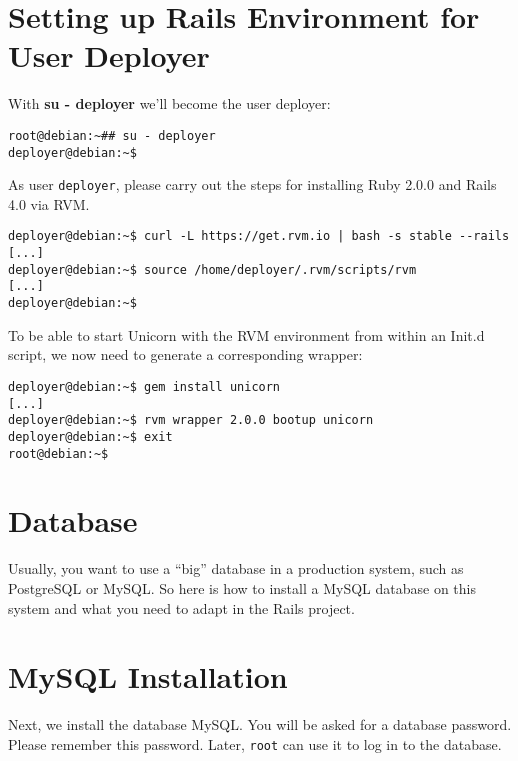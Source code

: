\documentclass[a4paper]{book}
\newcounter{tab}[chapter]
\begin{document}
\section{Setting up Rails Environment for User Deployer}\label{setting-up-rails-environment-for-user-deployer}

With \textbf{su - deployer} we'll become the user deployer:

\begin{shaded}\begin{verbatim}
root@debian:~## su - deployer
deployer@debian:~$
\end{verbatim}\end{shaded}

As user \texttt{deployer}, please carry out the steps for installing Ruby 2.0.0 and Rails 4.0 via RVM.

\begin{shaded}\begin{verbatim}
deployer@debian:~$ curl -L https://get.rvm.io | bash -s stable --rails
[...]
deployer@debian:~$ source /home/deployer/.rvm/scripts/rvm
[...]
deployer@debian:~$
\end{verbatim}\end{shaded}

To be able to start Unicorn with the RVM environment from within an Init.d script, we now need to generate a corresponding wrapper:

\begin{shaded}\begin{verbatim}
deployer@debian:~$ gem install unicorn
[...]
deployer@debian:~$ rvm wrapper 2.0.0 bootup unicorn
deployer@debian:~$ exit
root@debian:~$
\end{verbatim}\end{shaded}

\section{Database}\label{database}

Usually, you want to use a “big” database in a production system, such as PostgreSQL or MySQL. So here is how to install a MySQL database on this system and what you need to adapt in the Rails project.

\section{MySQL Installation}\label{mysql-installation}

Next, we install the database MySQL. You will be asked for a database password. Please remember this password. Later, \texttt{root} can use it to log in to the database.
\end{document}
